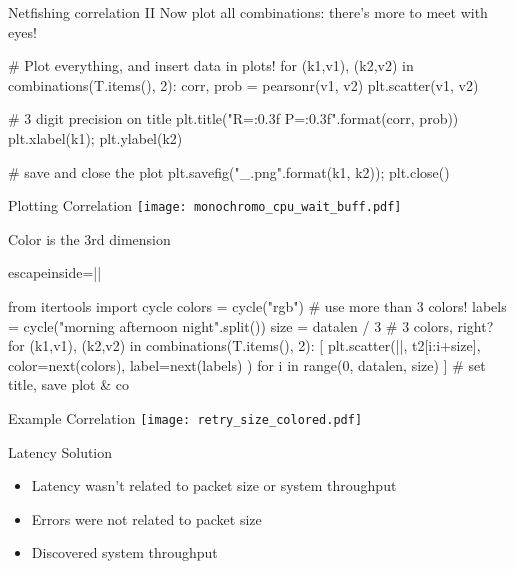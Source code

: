 \documentclass{beamer}[10]
\begin{document}
\begin{pyframe}{Netfishing correlation II}
Now plot all combinations: there's more to meet with eyes!
\begin{pycode}
# Plot everything, and insert data in plots!
for (k1,v1), (k2,v2) in combinations(T.items(), 2):
    corr, prob = pearsonr(v1, v2)
    plt.scatter(v1, v2)

    # 3 digit precision on title
    plt.title("R={:0.3f} P={:0.3f}".format(corr, prob))
    plt.xlabel(k1); plt.ylabel(k2)

    # save and close the plot
    plt.savefig("{}_{}.png".format(k1, k2)); plt.close()   
\end{pycode}
\end{pyframe}

\begin{pyframe}{Plotting Correlation}
\texttt{[image: monochromo\_cpu\_wait\_buff.pdf]}
\end{pyframe}

\begin{pyframe}{Color is the 3rd dimension}
\begin{pycode*}{escapeinside=||}

from itertools import cycle
colors = cycle("rgb")   # use more than 3 colors!
labels = cycle("morning afternoon night".split())
size = datalen / 3      # 3 colors, right?
for (k1,v1), (k2,v2) in combinations(T.items(), 2):  
  [    plt.scatter(||, t2[i:i+size], 
        color=next(colors), 
        label=next(labels)
        ) for i in range(0, datalen, size) ]
  # set title, save plot & co

   
\end{pycode*}
\end{pyframe}

\iffalse
\begin{pyframe}{Example Correlation}
\texttt{[image: latency\_thruput\_colored.pdf]}
\end{pyframe}
\fi

\begin{pyframe}{Example Correlation}
\texttt{[image: retry\_size\_colored.pdf]}
\end{pyframe}


\begin{pyframe}{Latency Solution}
\begin{itemize}
\item Latency wasn't related to packet size or system throughput
\item Errors were not related to packet size
\item Discovered system throughput 
\end{itemize}
\end{pyframe}
\end{document}
